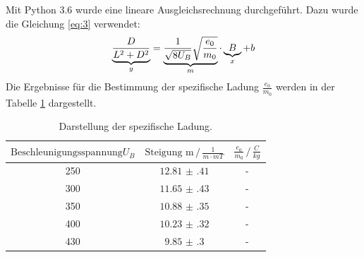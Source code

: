 Mit Python 3.6 wurde eine lineare Ausgleichsrechnung durchgeführt.
Dazu wurde die Gleichung \ref{eq:3} verwendet:
\begin{equation*}
  \underbrace{\frac{D}{L^2+D^2}}_{\mathclap{y}} = \underbrace{\frac{1}{\sqrt{8U_B}} \sqrt{\frac{e_0}{m_0}}}_{\mathclap{m}} \cdot \underbrace{B}_{\mathclap{x}} + b
\end{equation*}
Die Ergebnisse für die Bestimmung der spezifische Ladung $\frac{e_0}{m_0}$ werden
in der Tabelle \ref{tab:6} dargestellt.
\begin{table}[H]
  \centering
  \caption{Darstellung der spezifische Ladung.}
  \label{tab:6}
  \begin{tabular}{c c c}
\toprule
$\text{Beschleunigungsspannung} U_B$ & $\text{Steigung m} \,/\, \frac{1}{m\cdot mT}$ &$\frac{e_0}{m_0} \,/\, \frac{C}{kg}$\\
\midrule
250 &$\num{12.81(41)}$ &-\\
300 &$\num{11.65(43)}$ &-\\
350 &$\num{10.88(35)}$ &-\\
400 &$\num{10.23(32)}$ &-\\
430 &$\num{9.85(30)}$  &-\\
\bottomrule
  \end{tabular}
\end{table}
